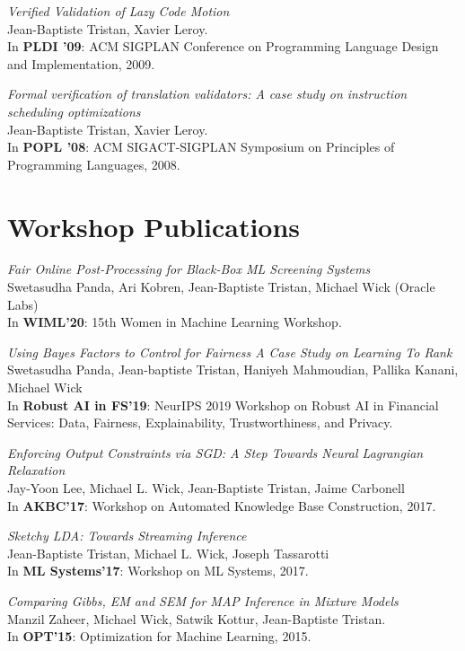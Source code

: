 \documentclass[margin,line]{res}
\begin{document}
\begin{resume}
\emph{Verified Validation of Lazy Code Motion}\\
Jean-Baptiste Tristan, Xavier Leroy.\\
In {\bf PLDI '09}: ACM SIGPLAN Conference on Programming
Language Design and Implementation, 2009. 

\emph{Formal verification of translation validators: A case study on instruction scheduling optimizations}\\
Jean-Baptiste Tristan, Xavier Leroy.\\
In {\bf POPL '08}: ACM SIGACT-SIGPLAN Symposium on
Principles of Programming Languages, 2008.

\section{\sc Workshop Publications}

\emph{Fair Online Post-Processing for Black-Box ML Screening Systems}\\
Swetasudha Panda, Ari Kobren, Jean-Baptiste Tristan, Michael Wick (Oracle Labs)\\
In {\bf WIML'20}: 15th Women in Machine Learning Workshop.

\emph{Using Bayes Factors to Control for Fairness A Case Study on Learning To Rank}\\
Swetasudha Panda, Jean-baptiste Tristan, Haniyeh Mahmoudian, Pallika Kanani, Michael Wick\\
In {\bf Robust AI in FS'19}: NeurIPS 2019 Workshop on Robust AI in Financial Services: Data, Fairness, Explainability, Trustworthiness, and Privacy.

\emph{Enforcing Output Constraints via SGD: A Step Towards Neural Lagrangian Relaxation}\\
Jay-Yoon Lee, Michael L. Wick, Jean-Baptiste Tristan, Jaime Carbonell\\
In {\bf AKBC'17}: Workshop on Automated Knowledge Base Construction, 2017.

\emph{Sketchy LDA: Towards Streaming Inference}\\
Jean-Baptiste Tristan, Michael L. Wick, Joseph Tassarotti\\
In {\bf ML Systems'17}: Workshop on ML Systems, 2017.


\emph{Comparing Gibbs, EM and SEM for MAP Inference in Mixture Models}\\
Manzil Zaheer, Michael Wick, Satwik Kottur, Jean-Baptiste Tristan.\\
In {\bf OPT'15}: Optimization for Machine Learning, 2015. 


\end{resume}
\end{document}
